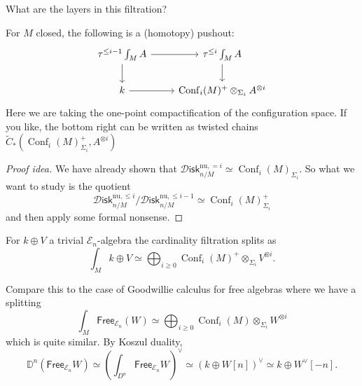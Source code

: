 \documentclass{amsart}
\DeclareMathOperator{\Conf}{Conf}
\begin{document}
What are the layers in this filtration?
\begin{lemma}
    For $M$ closed, the following is a (homotopy) pushout:
    \begin{equation*}
        \begin{tikzcd}
            \tau^{\leq i-1}\int_M A \dar \rar &\tau^{\leq i}\int_M A\dar\\
            k\rar &\Conf_i(M)^+ \otimes_{\Sigma_i}A^{\otimes i}
        \end{tikzcd}
    \end{equation*}
    Here we are taking the one-point compactification of the configuration space.
    If you like, the bottom right can be written as twisted chains
    $\tilde C_*(\Conf_i(M)^+_{\Sigma_i},A^{\otimes i})$
\end{lemma}
\begin{proof}[Proof idea]
    We have already shown that $\mathcal{D}\mathsf{isk}_{n/M}^{\text{nu},=i}\simeq \Conf_i(M)_{\Sigma_i}$.
    So what we want to study is the quotient
    \begin{equation*}
        \mathcal{D}\mathsf{isk}_{n/M}^{\text{nu},\leq i}/\mathcal{D}\mathsf{isk}_{n/M}^{\text{nu},\leq i-1}\simeq \Conf_i(M)^+_{\Sigma_i}
    \end{equation*}
    and then apply some formal nonsense.
\end{proof}


\begin{proposition}
    For $k\oplus V$ a trivial $\mathcal{E}_n$-algebra the cardinality filtration splits as
    \begin{equation*}
        \int_M k\oplus V \simeq \bigoplus_{i\geq 0}\Conf_i(M)^+\otimes_{\Sigma_i}V^{\otimes i}.
    \end{equation*}
\end{proposition}

Compare this to the case of Goodwillie calculus for free algebras where we have a splitting
\begin{equation*}
    \int_M \mathsf{Free}_{\mathcal{E}_n}(W) \simeq \bigoplus_{i\geq 0}\Conf_i(M)\otimes_{\Sigma_i} W^{\otimes i}
\end{equation*}
which is quite similar.
By Koszul duality,
\begin{equation*}
    \mathbb{D}^n(\mathsf{Free}_{\mathcal{E}_n} W) \simeq \left( \int_{D^n}\mathsf{Free}_{\mathcal{E}_n}W \right)^\vee \simeq (k\oplus W[n])^\vee
    \simeq k\oplus W^\vee[-n].
\end{equation*}
\end{document}

